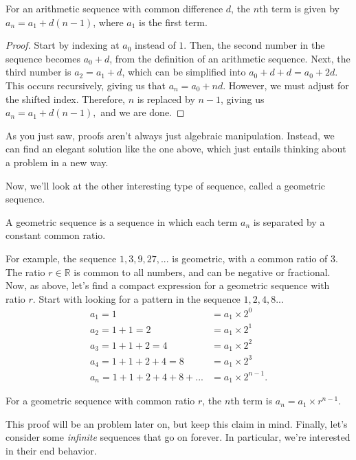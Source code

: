 \documentclass[11pt]{article}
\begin{document}
\begin{thrm}
	For an arithmetic sequence with common difference $d$, the $n$th term is given by $a_n = a_1 + d(n-1)$, where $a_1$ is the first term.
\end{thrm}
\begin{proof}
	Start by indexing at $a_0$ instead of $1$. Then, the second number in the sequence becomes $a_0 + d$, from the definition of an arithmetic sequence. Next, the third number is $a_2 = a_1 + d$, which can be simplified into $a_0 + d + d = a_0 +2d$. This occurs recursively, giving us that $a_n = a_0 + nd$. However, we must adjust for the shifted index. Therefore, $n$ is replaced by $n-1$, giving us $a_n = a_1 + d(n-1),$ and we are done.
\end{proof}
\begin{remark}
	As you just saw, proofs aren't always just algebraic manipulation. Instead, we can find an elegant solution like the one above, which just entails thinking about a problem in a new way.
\end{remark}
Now, we'll look at the other interesting type of sequence, called a geometric sequence.

\begin{defn}
	A geometric sequence is a sequence in which each term $a_n$ is separated by a constant common ratio.
\end{defn}
For example, the sequence $1, 3, 9, 27, ...$ is geometric, with a common ratio of 3. The ratio $r \in \mathbb{R}$ is common to all numbers, and can be negative or fractional. Now, as above, let's find a compact expression for a geometric sequence with ratio $r$. Start with looking for a pattern in the sequence $1, 2, 4, 8...$
\begin{align*}
	a_1 = 1 &= a_1 \times 2^0 \\
	a_2 = 1 + 1 = 2 &= a_1 \times 2^{1} \\
	a_3 = 1 + 1 + 2 = 4 &= a_1 \times 2^2 \\
	a_4 = 1 + 1 + 2 +  4 = 8 &= a_1 \times 2^3 \\
	a_n = 1 + 1 + 2 + 4 + 8 + ... &= \boxed{a_1 \times 2^{n-1}.}
\end{align*}
\begin{prop}
	For a geometric sequence with common ratio $r$, the $n$th term is $a_n = a_1 \times r^{n-1}$.
\end{prop}
This proof will be an problem later on, but keep this claim in mind. Finally, let's consider some \textit{infinite} sequences that go on forever. In particular, we're interested in their end behavior.
\end{document}
